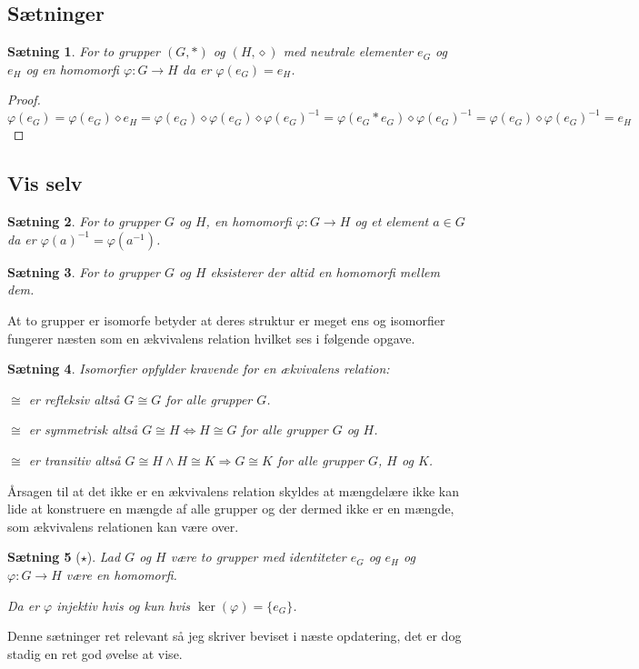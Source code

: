 \documentclass{article}
\newcommand{\inv}{^{-1}}
\newcommand{\imp}{\Rightarrow}
\newcommand{\biimp}{\Leftrightarrow}
\newcommand{\too}{\rightarrow}
\newtheorem{setn}{Sætning}
\begin{document}
		\subsection*{Sætninger}
		\begin{setn}
			For to grupper $(G,*)$ og $(H, \diamond)$ med neutrale elementer $e_G$ og $e_H$
			og en homomorfi $\varphi: G \too H$ da er $\varphi(e_G) = e_H$.
		\end{setn}
		\begin{proof}
			$$\varphi(e_G) = \varphi(e_G)\diamond e_H
			= \varphi(e_G)\diamond\varphi(e_G)\diamond\varphi(e_G)\inv
			= \varphi(e_G*e_G)\diamond\varphi(e_G)\inv
			= \varphi(e_G)\diamond\varphi(e_G)\inv = e_H$$
		\end{proof}
		\subsection*{Vis selv}
		\begin{setn}
			For to grupper $G$ og $H$, en homomorfi $\varphi: G \too H$
			og et element $a \in G$ da er $\varphi(a)\inv = \varphi(a\inv)$.
		\end{setn}
		\begin{setn}
			For to grupper $G$ og $H$ eksisterer der altid en homomorfi mellem dem.
		\end{setn}
		At to grupper er isomorfe betyder at deres struktur er meget ens og isomorfier
		fungerer næsten som en ækvivalens relation hvilket ses i følgende opgave.
		\begin{setn}
			Isomorfier opfylder kravende for en ækvivalens relation:

			$\cong$ er refleksiv altså $G \cong G$ for alle grupper $G$.

			$\cong$ er symmetrisk altså $G \cong H \biimp H \cong G$ for
			alle grupper $G$ og $H$.

			$\cong$ er transitiv altså $G \cong H \wedge H \cong K \imp G \cong K$
			for alle grupper $G$, $H$ og $K$.

		\end{setn}
		Årsagen til at det ikke er en ækvivalens relation skyldes at mængdelære ikke
		kan lide at konstruere en mængde af alle grupper og der dermed ikke er en mængde,
		som ækvivalens relationen kan være over.
		\begin{setn}[$\star$] \label{KerInj}
			Lad $G$ og $H$ være to grupper med identiteter $e_G$ og $e_H$
			og $\varphi: G \too H$ være en homomorfi.

			Da er $\varphi$ injektiv hvis og kun hvis $\ker(\varphi) = \{e_G\}$.
		\end{setn}
		Denne sætninger ret relevant så jeg skriver beviset i næste opdatering, det er
		dog stadig en ret god øvelse at vise.
	\newpage
\end{document}
